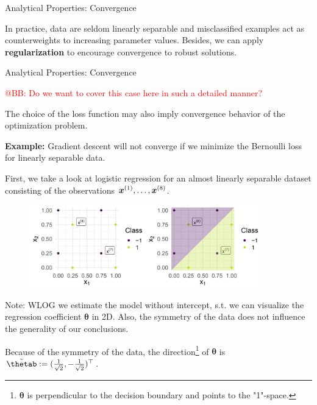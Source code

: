 \begin{vbframe}{Analytical Properties: Convergence}
\vfill

In practice, data are seldom linearly separable and misclassified 
examples act as counterweights to increasing parameter values. Besides, we 
can apply \textbf{regularization} to encourage convergence to robust solutions.

\end{vbframe}


\begin{vbframe}{Analytical Properties: Convergence}

\textcolor{red}{@BB: Do we want to cover this case here in such a detailed manner? }

The choice of the loss function may also imply convergence behavior of the optimization problem. 

\vspace*{0.2cm}

\textbf{Example: } Gradient descent will not converge if we minimize the Bernoulli loss for linearly separable data. 

\vspace*{0.2cm}

First, we take a look at logistic regression for an almost linearly separable dataset consisting of the observations $\bm{x}^{(1)}, \dots, \bm{x}^{(8)}$.
\vfill

\begin{figure}
\includegraphics[width=0.9\textwidth]{figure_man/undet-problem01.png}\\
\end{figure}


Note: WLOG we estimate the
model without intercept, s.t. we can visualize the regression coefficient 
$\bm{\theta}$ in 2D. Also, the symmetry of the data does not influence the generality of our conclusions.

\vspace*{0.2cm}

Because of the symmetry of the data, the direction\footnote[frame]{$\bm{\theta}$ is perpendicular to the decision boundary and points to the "1"-space.} of $\bm{\theta}$ is $\tilde\thetab := (\frac{1}{\sqrt{2}}, -\frac{1}{\sqrt{2}})^\top$.


\end{vbframe}
